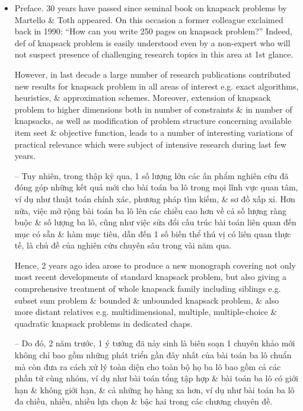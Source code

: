 \documentclass{article}
\begin{document}
\begin{itemize}
    \item {\sf Preface.} 30 years have passed since seminal book on knapsack problems by {\sc Martello \& Toth} appeared. On this occasion a former colleague exclaimed back in 1990: ``How can you write 250 pages on knapsack problem?'' Indeed, def of knapsack problem is easily understood even by a non-expert who will not suspect presence of challenging research topics in this area at 1st glance.

    However, in last decade a large number of research publications contributed new results for knapsack problem in all areas of interest e.g. exact algorithms, heuristics, \& approximation schemes. Moreover, extension of knapsack problem to higher dimensions both in number of constraints \& in number of knapsacks, as well as modification of problem structure concerning available item seet \& objective function, leads to a number of interesting variations of practical relevance which were subject of intensive research during last few years.

    -- Tuy nhiên, trong thập kỷ qua, 1 số lượng lớn các ấn phẩm nghiên cứu đã đóng góp những kết quả mới cho bài toán ba lô trong mọi lĩnh vực quan tâm, ví dụ như thuật toán chính xác, phương pháp tìm kiếm, \& sơ đồ xấp xỉ. Hơn nữa, việc mở rộng bài toán ba lô lên các chiều cao hơn về cả số lượng ràng buộc \& số lượng ba lô, cũng như việc sửa đổi cấu trúc bài toán liên quan đến mục có sẵn \& hàm mục tiêu, dẫn đến 1 số biến thể thú vị có liên quan thực tế, là chủ đề của nghiên cứu chuyên sâu trong vài năm qua.

    Hence, 2 years ago idea arose to produce a new monograph covering not only most recent developments of standard knapsack problem, but also giving a comprehensive treatment of whole knapsack family including siblings e.g. subset sum problem \& bounded \& unbounded knapsack problem, \& also more distant relatives e.g. multidimensional, multiple, multiple-choice \& quadratic knapsack problems in dedicated chaps.

    -- Do đó, 2 năm trước, 1 ý tưởng đã nảy sinh là biên soạn 1 chuyên khảo mới không chỉ bao gồm những phát triển gần đây nhất của bài toán ba lô chuẩn mà còn đưa ra cách xử lý toàn diện cho toàn bộ họ ba lô bao gồm cả các phần tử cùng nhóm, ví dụ như bài toán tổng tập hợp \& bài toán ba lô có giới hạn \& không giới hạn, \& cả những họ hàng xa hơn, ví dụ như bài toán ba lô đa chiều, nhiều, nhiều lựa chọn \& bậc hai trong các chương chuyên đề.


\end{itemize}
\end{document}
